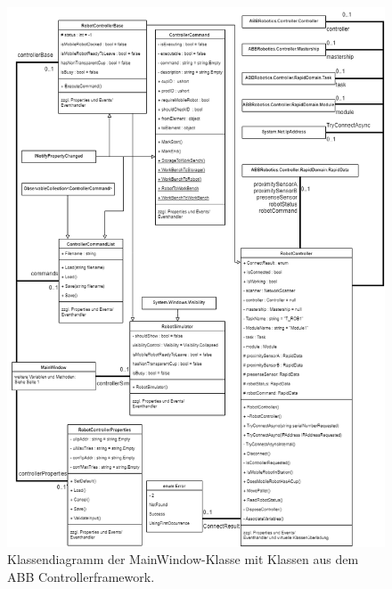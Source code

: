     \begin{figure}[ht]
        \label{fig:figure3}
        \includegraphics[width = \textwidth ]{Bilder/LV_Klassendiagramm_ABBController}
        \caption[Klassendiagramm ABB Controller ]
        {\small Klassendiagramm der MainWindow-Klasse mit Klassen aus dem ABB Controllerframework. }
        \centering
    \end{figure}

